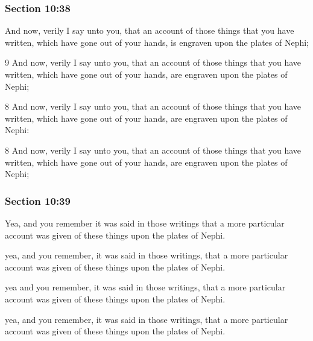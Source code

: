 	\subsubsection{Section 10:38} %
		\label{DC10-38}

		And now, verily I say unto you, that an account of those things that you have written, which have gone out of your hands, is engraven upon the plates of Nephi;

		\begin{framed}
		\scriptsize
			\begin{compactdesc}
				\item[JSP] 9 And now, verily I say unto you, that an account of those things that you have written, which have gone out of your hands, are engraven upon the plates of Nephi;
				\item[RB1] [\textit{missing}] 
				\item[DC 1835] 8 And now, verily I say unto you, that an account of those things that you have written, which have gone out of your hands, are engraven upon the plates of Nephi:
				\item[DC 1844] 8 And now, verily I say unto you, that an account of those things that you have written, which have gone out of your hands, are engraven upon the plates of Nephi;
			\end{compactdesc}
		\end{framed}

	\subsubsection{Section 10:39} %
		\label{DC10-39}

		Yea, and you remember it was said in those writings that a more particular account was given of these things upon the plates of Nephi.

		\begin{framed}
		\scriptsize
			\begin{compactdesc}
				\item[JSP] yea, and you remember, it was said in those writings, that a more particular account was given of these things upon the plates of Nephi.
				\item[RB1] [\textit{missing}] 
				\item[DC 1835] yea and you remember, it was said in those writings, that a more particular account was given of these things upon the plates of Nephi.
				\item[DC 1844] yea, and you remember, it was said in those writings, that a more particular account was given of these things upon the plates of Nephi.
			\end{compactdesc}
		\end{framed}

